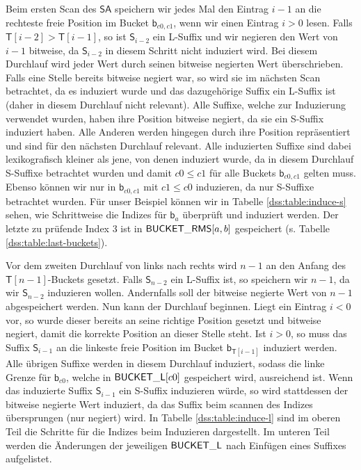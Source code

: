 Beim ersten Scan des $\mathsf{SA}$ speichern wir jedes Mal den Eintrag $i-1$ an die rechteste freie Position im Bucket $\mathsf{b}_{c0,c1}$, wenn wir einen Eintrag $i > 0$ lesen. Falls $\mathsf{T}[i-2] > \mathsf{T}[i-1]$, so ist $\mathsf{S}_{i-2}$ ein L-Suffix und wir negieren den Wert von $i-1$ bitweise, da $\mathsf{S}_{i-2}$ in diesem Schritt nicht induziert wird. Bei diesem Durchlauf wird jeder Wert durch seinen bitweise negierten Wert überschrieben. Falls eine Stelle bereits bitweise negiert war, so wird sie im nächsten Scan betrachtet, da es induziert wurde und das dazugehörige Suffix ein L-Suffix ist (daher in diesem Durchlauf nicht relevant). Alle Suffixe, welche zur Induzierung verwendet wurden, haben ihre Position bitweise negiert, da sie ein S-Suffix induziert haben. Alle Anderen werden hingegen durch ihre Position repräsentiert und sind für den nächsten Durchlauf relevant. Alle induzierten Suffixe sind dabei lexikografisch kleiner als jene, von denen induziert wurde, da in diesem Durchlauf S-Suffixe betrachtet wurden und damit $c0 \leq c1$ für alle Buckets $\mathsf{b}_{c0,c1}$ gelten muss. Ebenso können wir nur in $\mathsf{b}_{c0,c1}$ mit $c1 \leq c0$ induzieren, da nur S-Suffixe betrachtet wurden. Für unser Beispiel können wir in Tabelle \ref{dss:table:induce-s} sehen, wie Schrittweise die Indizes für $\mathsf{b}_{a}$ überprüft und induziert werden. Der letzte zu prüfende Index 3 ist in $\mathsf{BUCK\-ET\_RMS}[a,b]$ gespeichert (s. Tabelle \ref{dss:table:last-buckets}).

Vor dem zweiten Durchlauf von links nach rechts wird $n-1$ an den Anfang des $\mathsf{T}[n-1]$-Buckets gesetzt. Falls $\mathsf{S}_{n-2}$ ein L-Suffix ist, so speichern wir $n-1$, da wir $\mathsf{S}_{n-2}$ induzieren wollen. Andernfalls soll der bitweise negierte Wert von $n-1$ abgespeichert werden. Nun kann der Durchlauf beginnen.
Liegt ein Eintrag $i < 0$ vor, so wurde dieser bereits an seine richtige Position gesetzt und bitweise negiert, damit die korrekte Position an dieser Stelle steht. Ist $i > 0$, so muss das Suffix $\mathsf{S}_{i-1}$ an die linkeste freie Position im Bucket $\mathsf{b}_{\mathsf{T}[i-1]}$ induziert werden. Alle übrigen Suffixe werden in diesem Durchlauf induziert, sodass die linke Grenze für $\mathsf{b}_{c0}$, welche in $\mathsf{BUCK\-ET\_L}[c0]$ gespeichert wird, ausreichend ist. Wenn das induzierte Suffix $\mathsf{S}_{i-1}$ ein S-Suffix induzieren würde, so wird stattdessen der bitweise negierte Wert induziert, da das Suffix beim scannen des Indizes übersprungen (nur negiert) wird. In Tabelle \ref{dss:table:induce-l} sind im oberen Teil die Schritte für die Indizes beim Induzieren dargestellt. Im unteren Teil werden die Änderungen der jeweiligen $\mathsf{BUCK\-ET\_L}$ nach Einfügen eines Suffixes aufgelistet.
